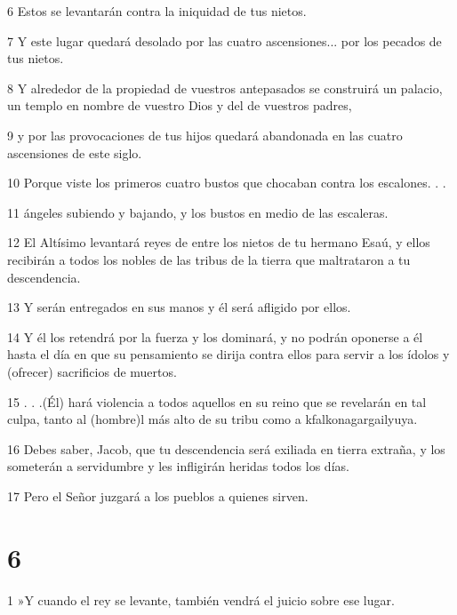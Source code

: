 \par 6 Estos se levantarán contra la iniquidad de tus nietos.

\par 7 Y este lugar quedará desolado por las cuatro ascensiones... por los pecados de tus nietos.

\par 8 Y alrededor de la propiedad de vuestros antepasados ​​se construirá un palacio, un templo en nombre de vuestro Dios y del de vuestros padres,

\par 9 y por las provocaciones de tus hijos quedará abandonada en las cuatro ascensiones de este siglo.

\par 10 Porque viste los primeros cuatro bustos que chocaban contra los escalones. . .

\par 11 ángeles subiendo y bajando, y los bustos en medio de las escaleras.

\par 12 El Altísimo levantará reyes de entre los nietos de tu hermano Esaú, y ellos recibirán a todos los nobles de las tribus de la tierra que maltrataron a tu descendencia.

\par 13 Y serán entregados en sus manos y él será afligido por ellos.

\par 14 Y él los retendrá por la fuerza y ​​los dominará, y no podrán oponerse a él hasta el día en que su pensamiento se dirija contra ellos para servir a los ídolos y (ofrecer) sacrificios de muertos.

\par 15 . . .(Él) hará violencia a todos aquellos en su reino que se revelarán en tal culpa, tanto al (hombre)l más alto de su tribu como a kfalkonagargailyuya.

\par 16 Debes saber, Jacob, que tu descendencia será exiliada en tierra extraña, y los someterán a servidumbre y les infligirán heridas todos los días.

\par 17 Pero el Señor juzgará a los pueblos a quienes sirven.

\chapter{6}

\par 1 »Y cuando el rey se levante, también vendrá el juicio sobre ese lugar.

